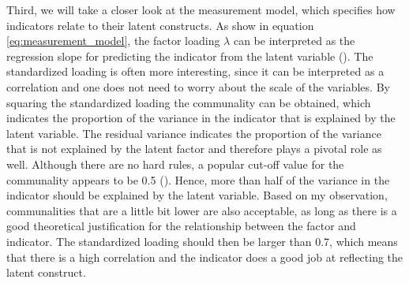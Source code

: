 \documentclass[11pt]{article}
\begin{document}
Third, we will take a closer look at the measurement model, which specifies
how indicators relate to their latent constructs. As show in equation
\ref{eq:measurement_model}, the factor loading $\lambda$ can be
interpreted as the regression slope for predicting the indicator from the latent
variable (\cite{brown2015}). The standardized loading is often more interesting,
since it can be interpreted as a correlation and one does not need to worry
about the scale of the variables. By squaring the standardized loading the
communality can be obtained, which indicates the proportion of the variance in
the indicator that is explained by the latent variable. The residual variance
indicates the proportion of the variance that is not explained by the latent
factor and therefore plays a pivotal role as well. Although there are no hard
rules, a popular cut-off value for the communality appears to be 0.5
(\cite{hair2010}). Hence, more than half of the variance in the indicator should
be explained by the latent variable. Based on my observation, communalities that
are a little bit lower are also acceptable, as long as there is a good
theoretical justification for the relationship between the factor and indicator.
The standardized loading should then be larger than 0.7, which means that there
is a high correlation and the indicator does a good job at reflecting the latent
construct.

\end{document}
